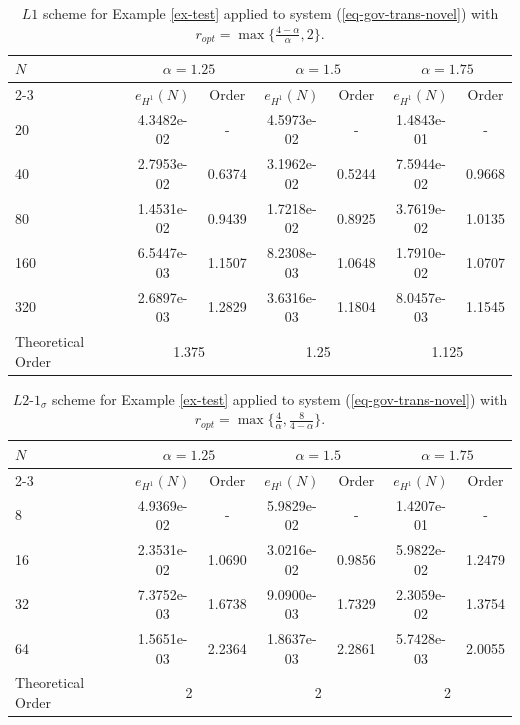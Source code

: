 \documentclass[11pt]{article}
\numberwithin{equation}{section}
\begin{document}
\begin{table}[!ht]
\caption{$L1$ scheme for Example \ref{ex-test} applied to system (\ref{eq-gov-trans-novel}) with $r_{opt} =\max\{\frac{4-\alpha}{\alpha},2\}$.}\label{table-test3}
\renewcommand{\arraystretch}{1}
\def\temptablewidth{0.95\textwidth}
\begin{center}
 \begin{tabular*}{\temptablewidth}{@{\extracolsep{\fill}}lcccccc}\hline
 $N$  &\multicolumn{2}{c}{$\alpha=1.25$} &\multicolumn{2}{c}{$\alpha=1.5$} &\multicolumn{2}{c}{$\alpha=1.75$}\\
 \cline{2-3}\cline{4-5}\cline{6-7}
 & $e_{H^1}(N)$         &Order     &$e_{H^1}(N)$    &Order    &$e_{H^1}(N)$ &Order     \\ \hline   
 20  &4.3482e-02   &-       &4.5973e-02   &-        &1.4843e-01  &-  \\
 40  &2.7953e-02   &0.6374  &3.1962e-02   &0.5244   &7.5944e-02  &0.9668    \\
 80  &1.4531e-02   &0.9439  &1.7218e-02   &0.8925   &3.7619e-02  &1.0135 \\
 160 &6.5447e-03   &1.1507  &8.2308e-03   &1.0648   &1.7910e-02  &1.0707    \\
 320 &2.6897e-03   &1.2829  &3.6316e-03   &1.1804   &8.0457e-03  &1.1545  \\\hline
 Theoretical Order
 &\multicolumn{2}{c}{1.375} &\multicolumn{2}{c}{1.25}&\multicolumn{2}{c}{1.125}\\ \hline
\end{tabular*}
\end{center}
\end{table}


\begin{table}[!ht]
\caption{$L2$-$1_\sigma$ scheme for Example \ref{ex-test} applied to system (\ref{eq-gov-trans-novel}) with $r_{opt} =\max\{\frac{4}{\alpha},\frac{8}{4-\alpha}\}$.}\label{table-test4}
\renewcommand{\arraystretch}{1}
\def\temptablewidth{0.95\textwidth}
\begin{center}
 \begin{tabular*}{\temptablewidth}{@{\extracolsep{\fill}}lcccccc}\hline
 $N$  &\multicolumn{2}{c}{$\alpha=1.25$} &\multicolumn{2}{c}{$\alpha=1.5$} &\multicolumn{2}{c}{$\alpha=1.75$}\\
 \cline{2-3}\cline{4-5}\cline{6-7}
 & $e_{H^1}(N)$         &Order     &$e_{H^1}(N)$    &Order    &$e_{H^1}(N)$ &Order     \\ \hline   
 8    &4.9369e-02   &-       &5.9829e-02   &-        &1.4207e-01  &-  \\
 16   &2.3531e-02   &1.0690  &3.0216e-02   &0.9856   &5.9822e-02  &1.2479    \\
 32  &7.3752e-03   &1.6738  &9.0900e-03   &1.7329   &2.3059e-02  &1.3754 \\
 64  &1.5651e-03   &2.2364  &1.8637e-03   &2.2861   &5.7428e-03  &2.0055  \\\hline
 Theoretical Order
 &\multicolumn{2}{c}{2} &\multicolumn{2}{c}{2}&\multicolumn{2}{c}{2}\\ \hline
\end{tabular*}
\end{center}
\end{table}
\end{document}
